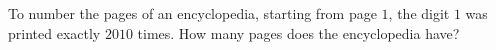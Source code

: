 To number the pages of an encyclopedia, starting from page $1$, the digit $1$ was printed exactly $2010$ times. How many pages does the encyclopedia have?

